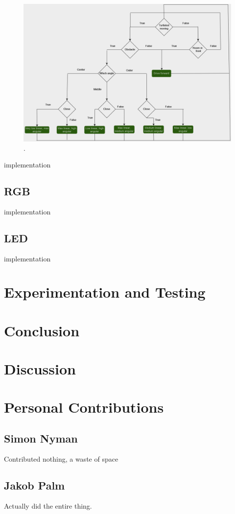 \documentclass[conference]{IEEEtran}
\begin{document}
\begin{figure}[htbp]
    \centerline{\includegraphics[width=0.9\columnwidth]{Pictures/Flowchart.png}}
    \caption{.}
    \label{sec:flowchart}
    \end{figure}
implementation
\subsection{RGB}
implementation
\subsection{LED}
implementation
\section{Experimentation and Testing}

\section{Conclusion}

\section{Discussion}

\section{Personal Contributions}

\subsection{Simon Nyman}
Contributed nothing, a waste of space

\subsection{Jakob Palm}
Actually did the entire thing.
\end{document}
